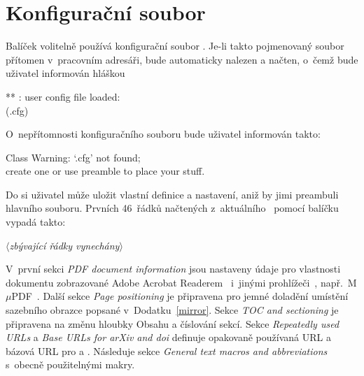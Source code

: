 
\chapter{Konfigurační soubor}\label{config}%

Balíček \pkg{\ipotname} volitelně používá konfigurační soubor . Je-li takto pojmenovaný soubor přítomen v~pracovním adresáři, bude
automaticky nalezen a načten, o~čemž bude uživatel informován hláškou

\medskip

{\small\ttfamily
\noindent
** \ipotname : user config file loaded:\\
(\ipotname .cfg)
\par}

\medskip

\noindent
O~nepřítomnosti konfiguračního souboru bude uživatel informován takto:

\medskip

{\small\ttfamily
\noindent
Class \ipotname{} Warning: `\ipotname .cfg' not found;\\
create one or use preamble to place your stuff.
\par}

\medskip

\noindent
Do  si uživatel může uložit vlastní definice a nastavení,
aniž by jimi  preambuli hlavního souboru. Prvních 46~řádků
načtených z~aktuálního~ pomocí balíčku
~\cite{Vos:LIVE:CTAN:fancyvrb} vypadá takto:

\noindent$\langle$\emph{zbývající řádky vynechány}$\rangle$

\medskip

V~první sekci \emph{PDF document information} jsou nastaveny údaje pro
vlastnosti dokumentu zobrazované Adobe Acrobat
Readerem~\cite{Adobe:LIVE::AcrobatReader} i~jinými
prohlížeči~, např.~M$\mu$PDF~\cite{Art:LIVE::MuPDF}. Další
sekce \emph{Page positioning} je připravena pro jemné doladění umístění
sazebního obrazce popsané v~Dodatku~\ref{mirror}. Sekce \emph{TOC and
  sectioning} je připravena na změnu hloubky Obsahu a číslování sekcí. Sekce
\emph{Repeatedly used URLs} a \emph{Base URLs for arXiv and doi} definuje
opakovaně používaná URL a bázová URL pro  a
. Následuje sekce \emph{General text macros and
  abbreviations} s~obecně použitelnými makry.


